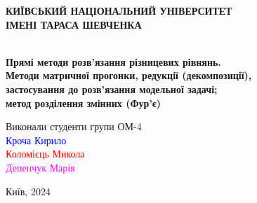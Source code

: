 \begin{titlepage}
    \begin{center}
        \large \textbf{КИЇВСЬКИЙ НАЦІОНАЛЬНИЙ УНІВЕРСИТЕТ \\
            ІМЕНІ ТАРАСА ШЕВЧЕНКА} \\

        \vspace{2.5cm}
        \vfill

        \\[2mm]

        {\large \textbf{
                        Прямі методи розв’язання різницевих рівнянь. \\
                        Методи матричної прогонки, редукції (декомпозиції), \\
                        застосування до розв’язання модельної задачі;\\ 
                        метод розділення змінних (Фур’є)}}
        \bigskip
        \vspace{4cm}

    \end{center}
    \vfill

    \newlength{\ML}
    \settowidth{\ML}{}
    \begin{minipage}{0.5\textwidth}
        Виконали студенти групи ОМ-4 \\
        \textcolor{blue}{Кроча Кирило} \\
        \textcolor{red}{Коломієць Микола} \\
        \textcolor{magenta}{Депенчук Марія}
    \end{minipage}%
    \bigskip

    \vfill

    \vspace{2cm}

    \begin{center}
        Київ, 2024
    \end{center}

\end{titlepage}

